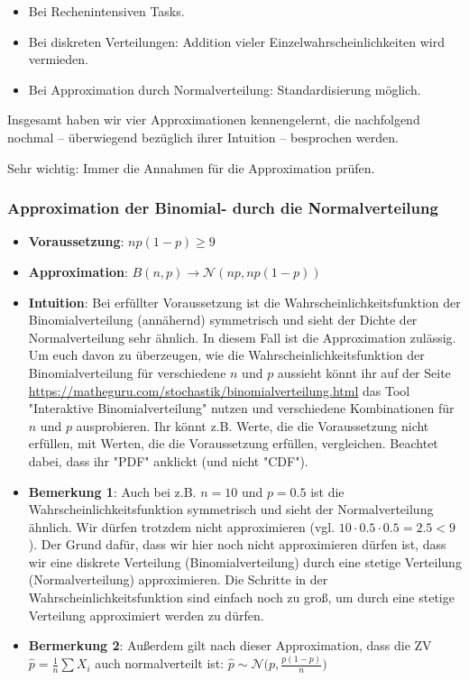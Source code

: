 \documentclass[a4paper]{article}
\newcommand\dangersign[1][2ex]{%
  \renewcommand\stacktype{L}%
  \scaleto{\stackon[1.3pt]{\color{red}$\triangle$}{\tiny !}}{#1}%
}
\begin{document}
\begin{itemize}
    \item Bei Rechenintensiven Tasks.
    \item Bei  diskreten Verteilungen: Addition vieler Einzelwahrscheinlichkeiten wird vermieden.
    \item Bei Approximation durch Normalverteilung: Standardisierung möglich.
\end{itemize}

\noindent Insgesamt haben wir vier Approximationen kennengelernt, die nachfolgend nochmal -- überwiegend bezüglich ihrer Intuition -- besprochen werden.

\noindent \dangersign[3ex] Sehr wichtig: Immer die Annahmen für die Approximation prüfen.

\subsubsection{Approximation der Binomial- durch die Normalverteilung}\label{sec:BinN}
\begin{itemize}
\item[] \textbf{Voraussetzung}: $np(1-p) \geq 9$
\item[] \textbf{Approximation}: $B(n,p) \rightarrow \mathcal{N}(np,np(1-p))$
\item[] \textbf{Intuition}: Bei erfüllter Voraussetzung ist die Wahrscheinlichkeitsfunktion der Binomialverteilung (annähernd) symmetrisch und sieht der Dichte der Normalverteilung sehr ähnlich. In diesem Fall ist die Approximation zulässig. Um euch davon zu überzeugen, wie die Wahrscheinlichkeitsfunktion der Binomialverteilung für verschiedene $n$ und $p$ aussieht könnt ihr auf der Seite \url{https://matheguru.com/stochastik/binomialverteilung.html} das Tool "Interaktive Binomialverteilung" nutzen und verschiedene Kombinationen für $n$ und $p$ ausprobieren. Ihr könnt z.B. Werte, die die Voraussetzung nicht erfüllen, mit Werten, die die Voraussetzung erfüllen, vergleichen. Beachtet dabei, dass ihr "PDF" anklickt (und nicht "CDF").
\item[] \textbf{Bemerkung 1}: Auch bei z.B. $n=10$ und $p=0.5$ ist die Wahrscheinlichkeitsfunktion symmetrisch und sieht der Normalverteilung ähnlich. Wir dürfen trotzdem nicht approximieren (vgl. $10\cdot0.5\cdot0.5=2.5<9$). Der Grund dafür, dass wir hier noch nicht approximieren dürfen ist, dass wir eine diskrete Verteilung (Binomialverteilung) durch eine stetige Verteilung (Normalverteilung) approximieren. Die Schritte in der Wahrscheinlichkeitsfunktion sind einfach noch zu groß, um durch eine stetige Verteilung approximiert werden zu dürfen.
\item[] \textbf{Bermerkung 2}: Außerdem gilt nach dieser Approximation, dass die ZV $\hat{p}=\frac{1}{n} \sum X_i$ auch normalverteilt ist: $\hat{p} \sim \mathcal{N}\Big(p,\frac{p(1-p)}{n}\Big)$
\end{itemize}
\end{document}
